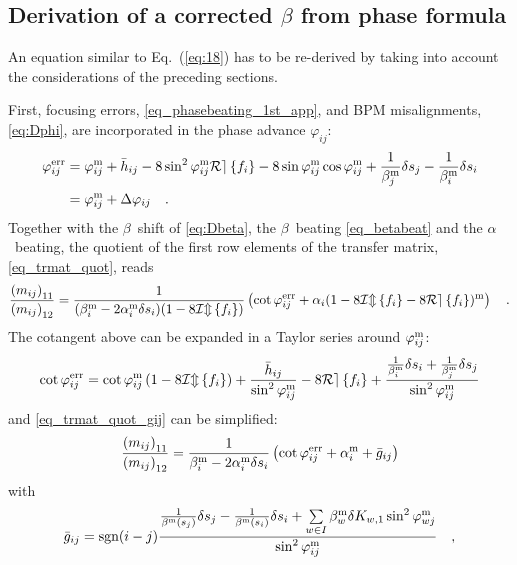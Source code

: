 \subsection{Derivation of a corrected \texorpdfstring{$\beta$}{beta} from phase formula}

An equation similar to Eq.~(\ref{eq:18}) has to be re-derived by taking into account the considerations
of the preceding sections.

First, focusing errors, \eqref{eq_phasebeating_1st_app},
and BPM misalignments, \eqref{eq:Dphi}, are incorporated in the phase advance $\varphi_{ij}$:
%
\begin{align}
    \varphi^\text{err}_{ij}  &=
    \varphi_{ij}^\text{m} + \bar{h}_{ij} - 8\sin^2\varphi_{ij}^\text{m}\mathcal{Re} \left\{ f_i \right\} - 8 \sin\varphi_{ij}^\text{m}\cos\varphi_{ij}^\text{m}
    + \frac{1}{\beta_j^\text{m}}\delta s_j - \frac{1}{\beta_i^\text{m}}\delta s_i \notag \\
    &= \varphi_{ij}^\text{m} + \Delta\varphi_{ij}
    \quad .
    \label{eq_phi_err}
\end{align}
%
Together with the $\beta$~shift of \eqref{eq:Dbeta}, the $\beta$~beating \eqref{eq_betabeat} and the
$\alpha$~beating,
the quotient of the first row elements of the transfer matrix, \eqref{eq_trmat_quot}, reads
%
\begin{equation}
    \frac{
        \left(m_{ij}\right)_{11}
    }{
        \left(m_{ij}\right)_{12}
    }
    =
    \frac{1}{
        (\beta_i^\text{m} - 2\alpha_i^\text{m}\delta s_i)(1-8\mathcal{Im} \left\{ f_i \right\})} 
    \left(
        \cot \varphi_{ij}^\text{err} +  \alpha_i(1-8\mathcal{Im} \left\{ f_i \right\} -8\mathcal{Re} \left\{ f_i \right\}) ^\text{m}
    \right)
    \quad .
    \label{eq_trmat_quot_gij}
\end{equation}
%
The cotangent above can be expanded in a Taylor series around $\varphi_{ij}^\text{m}$:
%
\begin{equation}
        \cot\varphi_{ij}^\text{err}
        =\cot\varphi_{ij}^\text{m} \left( 1 - 8\mathcal{Im} \left\{ f_i \right\}\right) + \frac{\bar{h}_{ij}}{\sin^2\varphi_{ij}^\text{m}} - 8 \mathcal{Re} \left\{ f_i \right\}
        + \frac{\frac{1}{\beta_i^\text{m}}\delta s_i + \frac{1}{\beta_j^\text{m}}\delta s_j}{\sin^2\varphi_{ij}^\text{m}}
\end{equation}
%
and \eqref{eq_trmat_quot_gij} can be simplified:
%
\begin{align}
    \frac{
        \left(m_{ij}\right)_{11}
    }{
        \left(m_{ij}\right)_{12}
    }
    =
    \frac{1}{\beta_i^\text{m} - 2\alpha_i^\text{m}\delta s_i} 
    \left(
        \cot \varphi_{ij}^\text{err} + \alpha_i ^\text{m} + \bar{g}_{ij}
    \right)
\end{align}
%
with 
%
\begin{equation}
\bar{g}_{ij} = \text{sgn}(i-j)\dfrac{ \frac{1}{\beta^\text{m}(s_j)}\delta s_j - \frac{1}{\beta^\text{m}(s_i)}\delta s_i +
\sum\limits_{w \in I}\beta_w^\text{m}\delta K_{w,1}\sin^2\varphi_{wj}^\text{m}}{\sin^2\varphi_{ij}^\text{m}}\quad ,
\label{eq:g_ij}
\end{equation}
